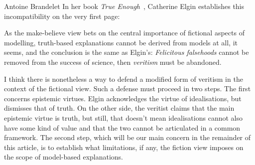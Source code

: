 \begin{artengenv}{Antoine Brandelet}
In her book \textit{True Enough}~\parencite*{Elgin2017}, Catherine Elgin establishes this incompatibility on the very first page: 


As the make-believe view bets on the central importance of fictional aspects of modelling, truth-based explanations cannot be derived from models at all, it seems, and the conclusion is the same as Elgin's: \textit{Felicitous falsehoods} cannot be removed from the success of science, then \textit{veritism} must be abandoned.

I think there is nonetheless a way to defend a modified form of veritism in the context of the fictional view. Such a defense must proceed in two steps. The first concerns epistemic virtues. Elgin acknowledges the virtue of idealisations, but dismisses that of truth. On the other side, the veritist claims that the main epistemic virtue is truth, but still, that doesn't mean idealisations cannot also have some kind of value and that the two cannot be articulated in a common framework. The second step, which will be our main concern in the remainder of this article, is to establish what limitations, if any, the fiction view imposes on the scope of model-based explanations.


\end{artengenv}
